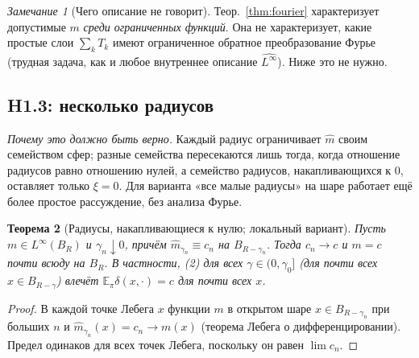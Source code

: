 \documentclass[11pt,a4paper]{article}
\numberwithin{equation}{section}
\newtheorem{theorem}{Теорема}[section]
\theoremstyle{definition}
\theoremstyle{remark}
\newtheorem{remark}[theorem]{Замечание}
\newcommand{\E}{\mathbb E}\newcommand{\R}{\mathbb R}\newcommand{\N}{\mathbb N}\let\Prob\relax\newcommand{\Prob}{\mathbb P}
\begin{document}
\begin{remark}[Чего описание не говорит]
Теор.~\ref{thm:fourier} характеризует допустимые $m$ \emph{среди ограниченных функций}. Она не характеризует, какие простые слои $\sum_kT_k$ имеют ограниченное обратное преобразование Фурье (трудная задача, как и любое внутреннее описание $\widehat{L^\infty}$). Ниже это не нужно.
\end{remark}

\subsection{H1.3: несколько радиусов}
\emph{Почему это должно быть верно.} Каждый радиус ограничивает $\hat m$ своим семейством сфер; разные семейства пересекаются лишь тогда, когда отношение радиусов равно отношению нулей, а семейство радиусов, накапливающихся к $0$, оставляет только $\xi=0$. Для варианта «все малые радиусы» на шаре работает ещё более простое рассуждение, без анализа Фурье.

\begin{theorem}[Радиусы, накапливающиеся к нулю; локальный вариант]\label{thm:allgamma}
Пусть $m\in L^\infty(B_R)$ и $\gamma_n\downarrow0$, причём $\hat m_{\gamma_n}\equiv c_n$ на $B_{R-\gamma_n}$. Тогда $c_n\to c$ и $m=c$ почти всюду на $B_R$. В частности, (2) для всех $\gamma\in(0,\gamma_0]$ (для почти всех $x\in B_{R-\gamma}$) влечёт $\E_\pi\delta(x,\cdot)=c$ для почти всех $x$.
\end{theorem}
\begin{proof}
В каждой точке Лебега $x$ функции $m$ в открытом шаре $x\in B_{R-\gamma_n}$ при больших $n$ и $\hat m_{\gamma_n}(x)=c_n\to m(x)$ (теорема Лебега о дифференцировании). Предел одинаков для всех точек Лебега, поскольку он равен $\lim c_n$.
\end{proof}
\end{document}
